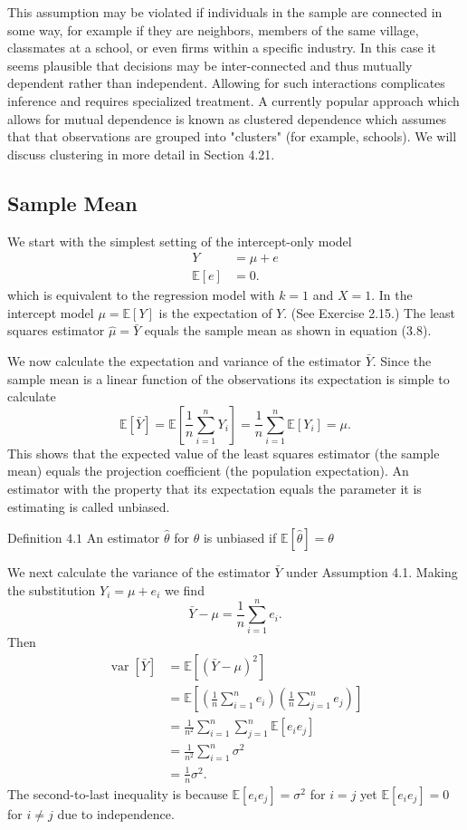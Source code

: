 \documentclass[10pt]{article}
\begin{document}
This assumption may be violated if individuals in the sample are connected in some way, for example if they are neighbors, members of the same village, classmates at a school, or even firms within a specific industry. In this case it seems plausible that decisions may be inter-connected and thus mutually dependent rather than independent. Allowing for such interactions complicates inference and requires specialized treatment. A currently popular approach which allows for mutual dependence is known as clustered dependence which assumes that that observations are grouped into "clusters" (for example, schools). We will discuss clustering in more detail in Section 4.21.

\subsection{Sample Mean}
We start with the simplest setting of the intercept-only model
$$
\begin{aligned}
Y &=\mu+e \\
\mathbb{E}[e] &=0 .
\end{aligned}
$$
which is equivalent to the regression model with $k=1$ and $X=1$. In the intercept model $\mu=\mathbb{E}[Y]$ is the expectation of $Y$. (See Exercise 2.15.) The least squares estimator $\widehat{\mu}=\bar{Y}$ equals the sample mean as shown in equation (3.8).

We now calculate the expectation and variance of the estimator $\bar{Y}$. Since the sample mean is a linear function of the observations its expectation is simple to calculate
$$
\mathbb{E}[\bar{Y}]=\mathbb{E}\left[\frac{1}{n} \sum_{i=1}^{n} Y_{i}\right]=\frac{1}{n} \sum_{i=1}^{n} \mathbb{E}\left[Y_{i}\right]=\mu .
$$
This shows that the expected value of the least squares estimator (the sample mean) equals the projection coefficient (the population expectation). An estimator with the property that its expectation equals the parameter it is estimating is called unbiased.

Definition $4.1$ An estimator $\widehat{\theta}$ for $\theta$ is unbiased if $\mathbb{E}[\widehat{\theta}]=\theta$

We next calculate the variance of the estimator $\bar{Y}$ under Assumption 4.1. Making the substitution $Y_{i}=\mu+e_{i}$ we find
$$
\bar{Y}-\mu=\frac{1}{n} \sum_{i=1}^{n} e_{i} .
$$
Then
$$
\begin{aligned}
\operatorname{var}[\bar{Y}] &=\mathbb{E}\left[(\bar{Y}-\mu)^{2}\right] \\
&=\mathbb{E}\left[\left(\frac{1}{n} \sum_{i=1}^{n} e_{i}\right)\left(\frac{1}{n} \sum_{j=1}^{n} e_{j}\right)\right] \\
&=\frac{1}{n^{2}} \sum_{i=1}^{n} \sum_{j=1}^{n} \mathbb{E}\left[e_{i} e_{j}\right] \\
&=\frac{1}{n^{2}} \sum_{i=1}^{n} \sigma^{2} \\
&=\frac{1}{n} \sigma^{2} .
\end{aligned}
$$
The second-to-last inequality is because $\mathbb{E}\left[e_{i} e_{j}\right]=\sigma^{2}$ for $i=j$ yet $\mathbb{E}\left[e_{i} e_{j}\right]=0$ for $i \neq j$ due to independence.
\end{document}

